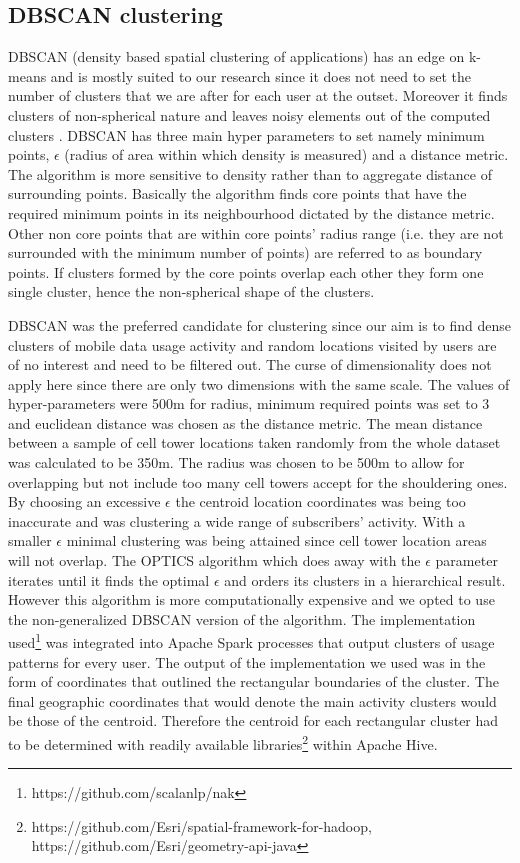 \documentclass[12pt, a4paper]{report}
\theoremstyle{definition}
\theoremstyle{definition}%
\theoremstyle{definition}%
\theoremstyle{definition}%
\theoremstyle{definition}%
\theoremstyle{definition}%
\begin{document}
\subsection{DBSCAN clustering}  \label{subsection:methodology:dbscan_clustering}
DBSCAN (density based spatial clustering of applications) has an edge on k-means and is mostly suited to our research since it does not need to set the number of clusters that we are after for each user at the outset. Moreover it finds clusters of non-spherical nature and leaves noisy elements out of the computed clusters \cite{ChakrabortyNKNagwaniLopamudraDey2011}. DBSCAN has three main hyper parameters to set namely minimum points,  $\epsilon$ (radius of area within which density is measured)  and a distance metric. The algorithm is more sensitive to density rather than to aggregate distance of surrounding points. Basically the algorithm finds core points that have the required minimum points in its neighbourhood dictated by the distance metric. Other non core points that are within core points' radius range (i.e. they are not surrounded with the minimum number of points) are referred to as boundary points. If clusters formed by the core points overlap each other they form one single cluster, hence the non-spherical shape of the clusters. 

DBSCAN was the preferred candidate for clustering since our aim is to find dense clusters of mobile data usage activity and random locations visited by users are of no interest and need to be filtered out. The curse of dimensionality does not apply here since there are only two dimensions with the same scale.  The values of hyper-parameters were 500m for radius, minimum required points was set to 3 and euclidean distance was chosen as the distance metric. The mean distance between a sample of cell tower locations taken randomly from the whole dataset was calculated to be 350m. The radius was chosen to be 500m to allow for overlapping but not include too many cell towers accept for the shouldering ones. By choosing an excessive $\epsilon$ the centroid location coordinates was being too inaccurate and was clustering a wide range of subscribers' activity. With a smaller $\epsilon$ minimal clustering was being attained since cell tower location areas will not overlap. The OPTICS algorithm which does away with the $\epsilon$ parameter iterates until it finds the optimal $\epsilon$ and orders its clusters in a hierarchical result. However this algorithm is more computationally expensive and we opted to use the non-generalized DBSCAN version of the algorithm. The implementation used\footnote{https://github.com/scalanlp/nak} was integrated into Apache Spark processes that output clusters of usage patterns for every user. The output of the implementation we used was in the form of coordinates that outlined the rectangular boundaries of the cluster. The final geographic coordinates that would denote the main activity clusters would be those of the centroid. Therefore the centroid for each rectangular cluster had to be determined with readily available libraries\footnote{https://github.com/Esri/spatial-framework-for-hadoop, https://github.com/Esri/geometry-api-java} within Apache Hive.   
\end{document}
